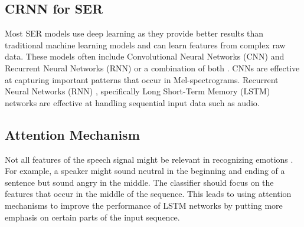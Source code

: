 \documentclass[../main.tex]{subfiles}
\begin{document}
\subsection{CRNN for SER} 
Most SER models use deep learning as they provide 
better results than traditional machine learning models and can learn features 
from complex raw data. These models often include Convolutional Neural Networks 
(CNN) and Recurrent Neural Networks (RNN) or a combination of both \citep{Hashem2023}. CNNs are 
effective at capturing important patterns that occur in Mel-spectrograms. 
Recurrent Neural Networks (RNN) , specifically Long Short-Term Memory (LSTM) 
networks are effective at handling sequential input data such as audio.

\subsection{Attention Mechanism} 
Not all features of the speech signal might 
be relevant in recognizing emotions \citep{Hashem2023}. For example, a speaker might sound neutral 
in the beginning and ending of a sentence but sound angry in the middle. The 
classifier should focus on the features that occur in the middle of the 
sequence. This leads to using attention mechanisms to improve the performance 
of LSTM networks by putting more emphasis on certain parts of the input 
sequence.
\end{document}
